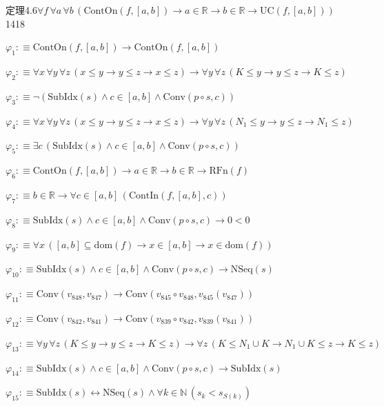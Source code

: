 \begin{fullproof}{定理4.6}{$\forall f\,\forall a\,\forall b\,(\mathrm{ContOn}(f,[a,b]) \to a \in \mathbb{R} \to b \in \mathbb{R} \to \mathrm{UC}(f,[a,b]))$}{1418}
\begin{ptree}
\end{ptree}
\begin{abbrevlist}
\item $\varphi_{1} :\equiv \mathrm{ContOn}(f,[a,b]) \to \mathrm{ContOn}(f,[a,b])$
\item $\varphi_{2} :\equiv \forall x\,\forall y\,\forall z\,(x \leq y \to y \leq z \to x \leq z) \to \forall y\,\forall z\,(K \leq y \to y \leq z \to K \leq z)$
\item $\varphi_{3} :\equiv \neg (\mathrm{SubIdx}(s) \land c \in [a,b] \land \mathrm{Conv}(p \circ s,c))$
\item $\varphi_{4} :\equiv \forall x\,\forall y\,\forall z\,(x \leq y \to y \leq z \to x \leq z) \to \forall y\,\forall z\,(N_{1} \leq y \to y \leq z \to N_{1} \leq z)$
\item $\varphi_{5} :\equiv \exists c\,(\mathrm{SubIdx}(s) \land c \in [a,b] \land \mathrm{Conv}(p \circ s,c))$
\item $\varphi_{6} :\equiv \mathrm{ContOn}(f,[a,b]) \to a \in \mathbb{R} \to b \in \mathbb{R} \to \mathrm{RFn}(f)$
\item $\varphi_{7} :\equiv b \in \mathbb{R} \to \forall c \in [a,b]\,(\mathrm{ContIn}(f,[a,b],c))$
\item $\varphi_{8} :\equiv \mathrm{SubIdx}(s) \land c \in [a,b] \land \mathrm{Conv}(p \circ s,c) \to 0 < 0$
\item $\varphi_{9} :\equiv \forall x\,([a,b] \subseteq \mathrm{dom}(f) \to x \in [a,b] \to x \in \mathrm{dom}(f))$
\item $\varphi_{10} :\equiv \mathrm{SubIdx}(s) \land c \in [a,b] \land \mathrm{Conv}(p \circ s,c) \to \mathrm{NSeq}(s)$
\item $\varphi_{11} :\equiv \mathrm{Conv}(v_{848},v_{847}) \to \mathrm{Conv}(v_{845} \circ v_{848},v_{845}(v_{847}))$
\item $\varphi_{12} :\equiv \mathrm{Conv}(v_{842},v_{841}) \to \mathrm{Conv}(v_{839} \circ v_{842},v_{839}(v_{841}))$
\item $\varphi_{13} :\equiv \forall y\,\forall z\,(K \leq y \to y \leq z \to K \leq z) \to \forall z\,(K \leq N_{1} \cup K \to N_{1} \cup K \leq z \to K \leq z)$
\item $\varphi_{14} :\equiv \mathrm{SubIdx}(s) \land c \in [a,b] \land \mathrm{Conv}(p \circ s,c) \to \mathrm{SubIdx}(s)$
\item $\varphi_{15} :\equiv \mathrm{SubIdx}(s) \leftrightarrow \mathrm{NSeq}(s) \land \forall k \in \mathbb{N}\,(s_{k} < s_{S(k)})$

\end{abbrevlist}
\end{fullproof}
